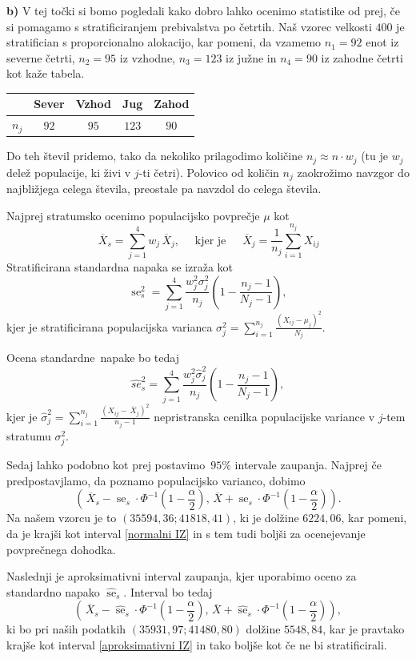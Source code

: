 \documentclass[a4paper,11pt]{article}
\newcommand{\olsi}[1]{\,\overline{\!{#1}}} %
\newcommand{\inv}{^{-1}}
\DeclareMathOperator{\se}{se}
\begin{document}
\noindent
\textbf{b)} V tej točki si bomo pogledali kako dobro lahko ocenimo statistike od prej, če si pomagamo s stratificiranjem prebivalstva po četrtih. Naš vzorec velkosti $400$ je stratifician s proporcionalno alokacijo, kar pomeni, da vzamemo $n_1 = 92$ enot iz severne četrti, $n_2 = 95$ iz vzhodne, $n_3 = 123$ iz južne in $n_4 = 90$ iz zahodne četrti kot kaže tabela.
\begin{center}
\begin{tabular}{|c || c c c c ||}
    \hline
    & Sever & Vzhod & Jug & Zahod \\
    \hline
    $n_j$ & $92$ & $95$ & $123$ & $90$ \\
    \hline 
\end{tabular}
\end{center}
Do teh števil pridemo, tako da nekoliko prilagodimo količine $n_j \approx n \cdot w_j$ (tu je $w_j$ delež populacije, ki živi v $j$-ti četri). Polovico od količin $n_j$ zaokrožimo navzgor do najbližjega celega števila, preostale pa navzdol do celega števila.

Najprej stratumsko ocenimo populacijsko povprečje $\mu$ kot
\[
    \olsi{X}_s = \sum_{j = 1}^4 w_j \olsi{X}_j, \quad \text{ kjer je } \quad \olsi{X}_j = \frac{1}{n_j}\sum_{i = 1}^{n_j} X_{ij}
\]
Stratificirana standardna napaka se izraža kot
\[
    \se^2_s = \sum_{j = 1}^4 \frac{w_j^2 \sigma_j^2}{n_j}\left(1 - \frac{n_j - 1}{N_j - 1}\right), 
\]
kjer je stratificirana populacijska varianca $\sigma_j^2 = \sum_{i = 1}^{n_j} \frac{(X_{ij} - \mu_j)^2}{N_j}$. 

Ocena standardne napake bo tedaj 
\[
    \hat{se}^2_s = \sum_{j = 1}^4 \frac{w_j^2 \hat{\sigma}_j^2}{n_j}\left(1 - \frac{n_j - 1}{N_j - 1}\right),
\] 
kjer je $\hat{\sigma}^2_j = \sum_{i = 1}^{n_j} \frac{(X_{ij} - \olsi{X}_j)^2}{n_j - 1}$ nepristranska cenilka populacijske variance v $j$-tem stratumu $\sigma_j^2$.

Sedaj lahko podobno kot prej postavimo $95\%$ intervale zaupanja. Najprej če predpostavjlamo, da poznamo populacijsko varianco, dobimo
\[
    \left(\olsi{X}_s - \se_s \cdot \Phi\inv\left(1 - \frac{\alpha}{2}\right), 
    \olsi{X} + \se_s \cdot \Phi\inv\left(1 - \frac{\alpha}{2}\right)\right).
\] 
Na našem vzorcu je to $\left(35594,36; 41818,41 \right)$, ki je dolžine $6224,06$, kar pomeni, da je krajši kot interval \eqref{normalni IZ} in s tem tudi boljši za ocenejevanje povprečnega dohodka. 

Naslednji je aproksimativni interval zaupanja, kjer uporabimo oceno za standardno napako $\hat{\se}_s$. Interval bo tedaj 
\[
    \left(\olsi{X}_s - \hat{\se}_s \cdot \Phi\inv\left(1 - \frac{\alpha}{2}\right), 
    \olsi{X} + \hat{\se}_s \cdot \Phi\inv\left(1 - \frac{\alpha}{2}\right)\right), 
\]
ki bo pri naših podatkih $\left(35931,97; 41480,80\right)$ dolžine $5548,84$, kar je pravtako krajše kot interval \eqref{aproksimativni IZ} in tako boljše kot če ne bi stratificirali.
\end{document}
